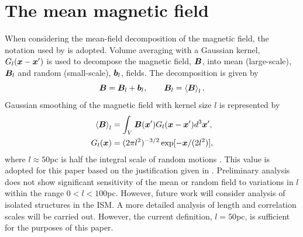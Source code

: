 \documentclass[useAMS,usenatbib]{mn2e}
\begin{document}
\section{The mean magnetic field}
When considering the mean-field decomposition of the magnetic field, the notation used by \citep{gent2} is adopted.
Volume averaging with a Gaussian kernel, $G_{l}(\boldsymbol{x}-\boldsymbol{x}')$ is used to decompose the magnetic field, $\boldsymbol{B}$, into mean (large-scale), $\boldsymbol{B}_{l}$ and random (small-scale), $\boldsymbol{b}_{l}$, fields. The decomposition is given by 
\begin{equation}
\boldsymbol{B} = \boldsymbol{B}_{l}+\boldsymbol{b}_{l},\qquad \boldsymbol{B}_{l} = \left<\boldsymbol{B}\right>_{l}. \label{decomp} 
\end{equation}
Gaussian smoothing of the magnetic field with kernel size $l$ is represented by
\begin{align}
\left<\boldsymbol{B}\right>_{l}&=\int_{V}\boldsymbol{B}(\boldsymbol{x}')G_{l}(\boldsymbol{x}-\boldsymbol{x}')d^{3}\boldsymbol{x}',\\
G_{l}(\boldsymbol{x})&=(2\pi l^2)^{-3/2}\exp[-\boldsymbol{x}/(2l^2)],\nonumber
\label{gauss}
\end{align} 
where $l\approx50$pc is half the integral scale of random motions \citep{gent2}. This value is adopted for this paper based on the justification given in \citep{gent2}.  Preliminary analysis does not show significant sensitivity of the mean or random field to variations in $l$ within the range $0<l<100$pc. However, future work will consider analysis of isolated structures in the ISM. A more detailed analysis of length and correlation scales will be carried out. However, the current definition, $l=50$pc, is sufficient for the purposes of this paper. 

\end{document}
